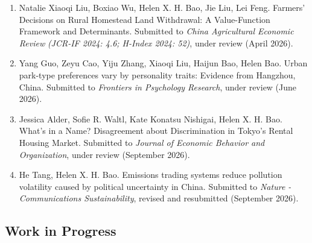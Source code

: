 \documentclass[10pt,a4paper]{article}
\begin{document}
\begin{enumerate}
  to \emph{Housing Studies} \emph{(JCR-IF 2024: 2.9; H-Index 2024: 95)},
  under review (May 2026).
\item
  Natalie Xiaoqi Liu, Boxiao Wu, Helen X. H. Bao, Jie Liu, Lei Feng.
  Farmers' Decisions on Rural Homestead Land Withdrawal: A
  Value-Function Framework and Determinants. Submitted to \emph{China
  Agricultural Economic Review} \emph{(JCR-IF 2024: 4.6; H-Index 2024:
  52)}, under review (April 2026).
\item
  Yang Guo, Zeyu Cao, Yiju Zhang, Xiaoqi Liu, Haijun Bao, Helen Bao.
  Urban park-type preferences vary by personality traits: Evidence from
  Hangzhou, China. Submitted to \emph{Frontiers in Psychology Research},
  under review (June 2026).
\item
  Jessica Alder, Sofie R. Waltl, Kate Konatsu Nishigai, Helen X. H. Bao.
  What's in a Name? Disagreement about Discrimination in Tokyo's Rental
  Housing Market. Submitted to \emph{Journal of Economic Behavior and
  Organization}, under review (September 2026).
\item
  He Tang, Helen X. H. Bao. Emissions trading systems reduce pollution
  volatility caused by political uncertainty in China. Submitted to
  \emph{Nature - Communications Sustainability}, revised and resubmitted
  (September 2026).
\end{enumerate}

\newpage

\subsection{Work in Progress}\label{work-in-progress}
\end{document}
